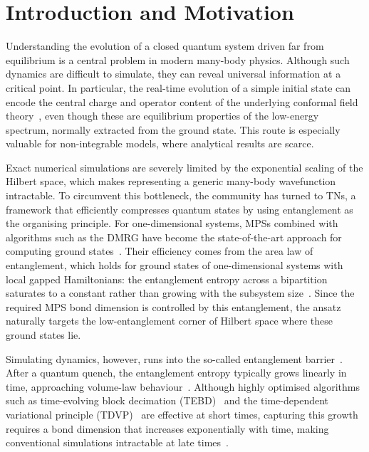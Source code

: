\documentclass[a4paper,onecolumn,11pt,unpublished]{quantumarticle}
\begin{document}
\clearpage
{}

\FloatBarrier
\section{Introduction and Motivation}
\label{sec:intro}

Understanding the evolution of a closed quantum system driven far from equilibrium is a central problem in modern many-body physics. Although such dynamics are difficult to simulate, they can reveal universal information at a critical point. In particular, the real-time evolution of a simple initial state can encode the central charge and operator content of the underlying conformal field theory~\cite{carignano_tagliacozzo2025}, even though these are equilibrium properties of the low-energy spectrum, normally extracted from the ground state. This route is especially valuable for non-integrable models, where analytical results are scarce.

Exact numerical simulations are severely limited by the exponential scaling of the Hilbert space, which makes representing a generic many-body wavefunction intractable. To circumvent this bottleneck, the community has turned to \acp{TN}, a framework that efficiently compresses quantum states by using entanglement as the organising principle. For one-dimensional systems, \acp{MPS} combined with algorithms such as the \ac{DMRG} have become the state-of-the-art approach for computing ground states~\cite{white1992,schollwock2011,banuls2023}. Their efficiency comes from the area law of entanglement, which holds for ground states of one-dimensional systems with local gapped Hamiltonians: the entanglement entropy across a bipartition saturates to a constant rather than growing with the subsystem size~\cite{hastings2007}. Since the required \ac{MPS} bond dimension is controlled by this entanglement, the ansatz naturally targets the low-entanglement corner of Hilbert space where these ground states lie.

Simulating dynamics, however, runs into the so-called entanglement barrier~\cite{reid2021,carignano2025sampled}. After a quantum quench, the entanglement entropy typically grows linearly in time, approaching volume-law behaviour~\cite{calabrese_cardy2005}. Although highly optimised algorithms such as time-evolving block decimation (TEBD)~\cite{vidal2004} and the time-dependent variational principle (TDVP)~\cite{haegeman2011} are effective at short times, capturing this growth requires a bond dimension that increases exponentially with time, making conventional simulations intractable at late times~\cite{schuch2008,paeckel2019}.
\end{document}
